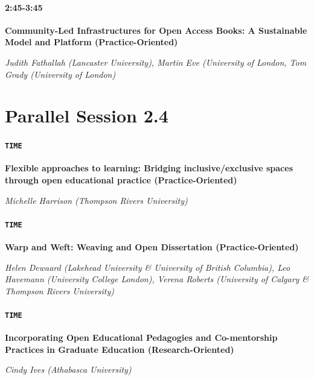 \documentclass[
]{book}
\begin{document}
\begin{secondary}
\hypertarget{section}{%
\paragraph*{2:45-3:45}\label{section}}

\textbf{Community-Led Infrastructures for Open Access Books: A
Sustainable Model and Platform (Practice-Oriented)}

\emph{Judith Fathallah (Lancaster University), Martin Eve (University of
London, Tom Grady (University of London)}
\end{secondary}

\hypertarget{parallel-session-2.4}{%
\section*{Parallel Session 2.4}\label{parallel-session-2.4}}

\begin{secondary}
\hypertarget{time}{%
\paragraph{\texorpdfstring{\texttt{TIME}}{TIME}}\label{time}}

\textbf{Flexible approaches to learning: Bridging inclusive/exclusive
spaces through open educational practice (Practice-Oriented)}

\emph{Michelle Harrison (Thompson Rivers University)}
\end{secondary}

\begin{secondary}
\hypertarget{time}{%
\paragraph{\texorpdfstring{\texttt{TIME}}{TIME}}\label{time}}

\textbf{Warp and Weft: Weaving and Open Dissertation
(Practice-Oriented)}

\emph{Helen Dewaard (Lakehead University \& University of British
Columbia), Leo Havemann (University College London), Verena Roberts
(University of Calgary \& Thompson Rivers University)}
\end{secondary}

\begin{secondary}
\hypertarget{time}{%
\paragraph{\texorpdfstring{\texttt{TIME}}{TIME}}\label{time}}

\textbf{Incorporating Open Educational Pedagogies and Co-mentorship
Practices in Graduate Education (Research-Oriented)}

\emph{Cindy Ives (Athabasca University)}
\end{secondary}
\end{document}
